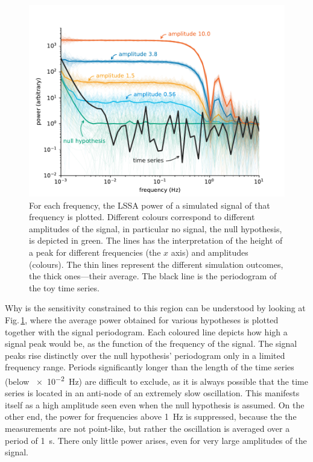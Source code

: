 \begin{figure}
  \centering \includegraphics[width=0.9\linewidth]{gfx/axions/basic_exclusion_sensitivity.pdf}
  \caption{For each frequency, the LSSA power of a simulated signal of that frequency is plotted. Different colours correspond to different amplitudes of the signal, in particular no signal, the null hypothesis, is depicted in green. The lines has the interpretation of the height of a peak for different frequencies (the $x$ axis) and amplitudes (colours). The thin lines represent the different simulation outcomes, the thick ones---their average. The black line is the periodogram of the toy time series.}\label{fig:sensitivity}
\end{figure}

Why is the sensitivity constrained to this region can be understood by looking at Fig.\,\ref{fig:sensitivity}, where the average power obtained for various hypotheses is plotted together with the signal periodogram. Each coloured line depicts how high a signal peak would be, as the function of the frequency of the signal.
The signal peaks rise distinctly over the null hypothesis' periodogram only in a limited frequency range. Periods significantly longer than the length of the time series (below \SI{e-2}{\hertz}) are difficult to exclude, as it is always possible that the time series is located in an anti-node of an extremely slow oscillation. This manifests itself as a high amplitude seen even when the null hypothesis is assumed. On the other end, the power for frequencies above \SI{1}{\hertz} is suppressed, because the the measurements are not point-like, but rather the oscillation is averaged over a period of \SI{1}{\second}. There only little power arises, even for very large amplitudes of the signal.

